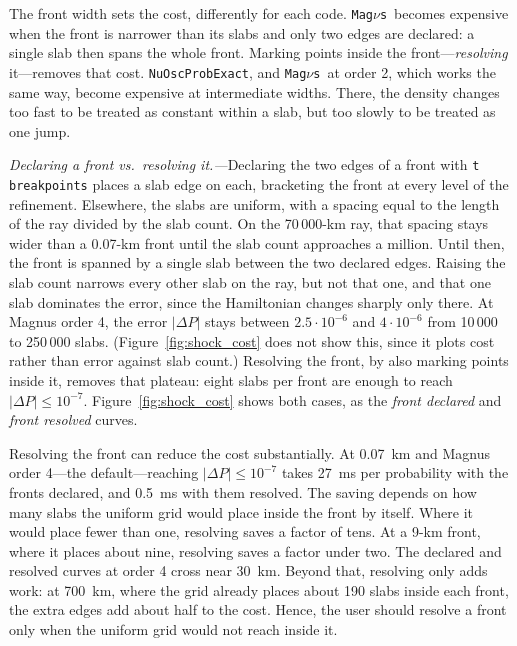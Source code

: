 \documentclass[final,5p,times,twocolumn,sort,compress]{elsarticle}
\makeatletter
\DeclareRobustCommand{\_}{%
  \ifmmode\nfss@text{\textunderscore}\else\textunderscore\allowbreak\fi}
\newcommand{\magnus}{{\tt Mag}\ensuremath{\nu}{\tt s}}
\makeatother
\begin{document}
The front width sets the cost, differently for each code. \magnus\ becomes expensive when the front is narrower than its slabs and only two edges are declared: a single slab then spans the whole front. Marking points inside the front---\textit{resolving} it---removes that cost. {\tt NuOscProbExact}, and \magnus\ at order 2, which works the same way, become expensive at intermediate widths. There, the density changes too fast to be treated as constant within a slab, but too slowly to be treated as one jump.

\smallskip

\textit{Declaring a front vs.~resolving it.---}Declaring the two edges of a front with {\tt t\_breakpoints} places a slab edge on each, bracketing the front at every level of the refinement. Elsewhere, the slabs are uniform, with a spacing equal to the length of the ray divided by the slab count. On the 70\,000-km ray, that spacing stays wider than a 0.07-km front until the slab count approaches a million. Until then, the front is spanned by a single slab between the two declared edges. Raising the slab count narrows every other slab on the ray, but not that one, and that one slab dominates the error, since the Hamiltonian changes sharply only there. At Magnus order 4, the error $\lvert \Delta P \rvert$ stays between $2.5 \cdot 10^{-6}$ and $4 \cdot 10^{-6}$ from 10\,000 to 250\,000 slabs. (Figure~\ref{fig:shock_cost} does not show this, since it plots cost rather than error against slab count.) Resolving the front, by also marking points inside it, removes that plateau: eight slabs per front are enough to reach $\lvert \Delta P \rvert \leq 10^{-7}$. Figure~\ref{fig:shock_cost} shows both cases, as the \textit{front declared} and \textit{front resolved} curves.

Resolving the front can reduce the cost substantially. At 0.07~km and Magnus order 4---the default---reaching $\lvert \Delta P \rvert \leq 10^{-7}$ takes 27~ms per probability with the fronts declared, and 0.5~ms with them resolved. The saving depends on how many slabs the uniform grid would place inside the front by itself. Where it would place fewer than one, resolving saves a factor of tens. At a 9-km front, where it places about nine, resolving saves a factor under two. The declared and resolved curves at order 4 cross near 30~km. Beyond that, resolving only adds work: at 700~km, where the grid already places about 190 slabs inside each front, the extra edges add about half to the cost. Hence, the user should resolve a front only when the uniform grid would not reach inside it.
\end{document}
